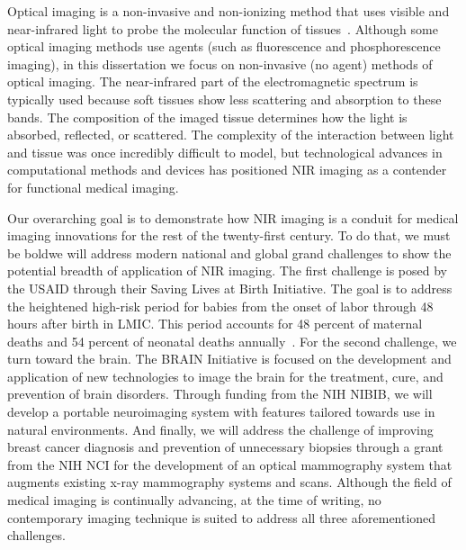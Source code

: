 Optical imaging is a non-invasive and non-ionizing method that uses visible and near-infrared light to probe the molecular function of tissues~\cite{Nunez2018}. Although some optical imaging methods use agents (such as fluorescence and phosphorescence imaging), in this dissertation we focus on non-invasive (no agent) methods of optical imaging. The near-infrared part of the electromagnetic spectrum is typically used because soft tissues show less scattering and absorption to these bands. The composition of the imaged tissue determines how the light is absorbed, reflected, or scattered. The complexity of the interaction between light and tissue was once incredibly difficult to model, but technological advances in computational methods and devices has positioned \ac{NIR} imaging as a contender for functional medical imaging.

Our overarching goal is to demonstrate how \ac{NIR} imaging is a conduit for medical imaging innovations for the rest of the twenty-first century. To do that, we must be bold\textemdash we will address modern national and global grand challenges to show the potential breadth of application of \ac{NIR} imaging. The first challenge is posed by the \ac{USAID} through their Saving Lives at Birth Initiative. The goal is to address the heightened high-risk period for babies from the onset of labor through 48 hours after birth in \ac{LMIC}. This period accounts for 48 percent of maternal deaths and 54 percent of neonatal deaths annually~\cite{SLAB2021}. For the second challenge, we turn toward the brain. The \ac{BRAIN} Initiative is focused on the development and application of new technologies to image the brain for the treatment, cure, and prevention of brain disorders. Through funding from the \ac{NIH} \ac{NIBIB}, we will develop a portable neuroimaging system with features tailored towards use in natural environments. And finally, we will address the challenge of improving breast cancer diagnosis and prevention of unnecessary biopsies through a grant from the \ac{NIH} \ac{NCI} for the development of an optical mammography system that augments existing x-ray mammography systems and scans. Although the field of medical imaging is continually advancing, at the time of writing, no contemporary imaging technique is suited to address all three aforementioned challenges. 


